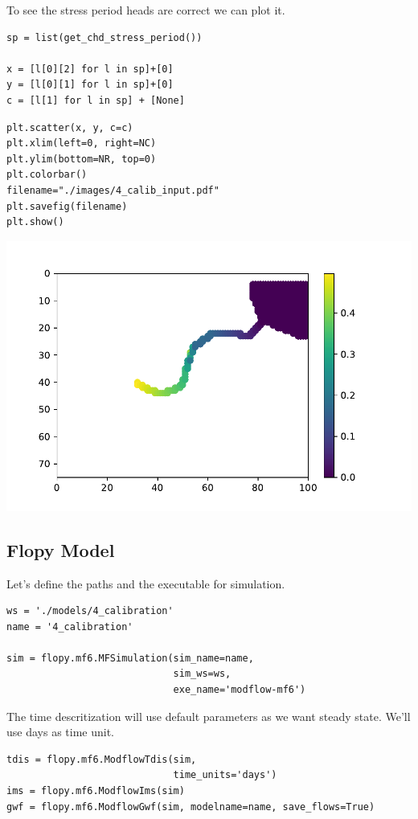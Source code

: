 \documentclass[titlepage,12pt]{unisubmission}
\begin{document}
To see the stress period heads are correct we can plot it.
\begin{verbatim}
sp = list(get_chd_stress_period())

x = [l[0][2] for l in sp]+[0]
y = [l[0][1] for l in sp]+[0]
c = [l[1] for l in sp] + [None]
\end{verbatim}


\begin{verbatim}
plt.scatter(x, y, c=c)
plt.xlim(left=0, right=NC)
plt.ylim(bottom=NR, top=0)
plt.colorbar()
filename="./images/4_calib_input.pdf"
plt.savefig(filename)
plt.show()
\end{verbatim}

\begin{center}
\includegraphics[width=.9\linewidth]{./images/4_calib_input.pdf}
\end{center}

\subsection{Flopy Model}
\label{sec:org9458b5f}

Let's define the paths and the executable for simulation.

\begin{verbatim}
ws = './models/4_calibration'
name = '4_calibration'

sim = flopy.mf6.MFSimulation(sim_name=name,
                             sim_ws=ws,
                             exe_name='modflow-mf6')
\end{verbatim}

The time descritization will use default parameters as we want steady state. We'll use days as time unit.

\begin{verbatim}
tdis = flopy.mf6.ModflowTdis(sim,
                             time_units='days')
ims = flopy.mf6.ModflowIms(sim)
gwf = flopy.mf6.ModflowGwf(sim, modelname=name, save_flows=True)
\end{verbatim}
\end{document}
